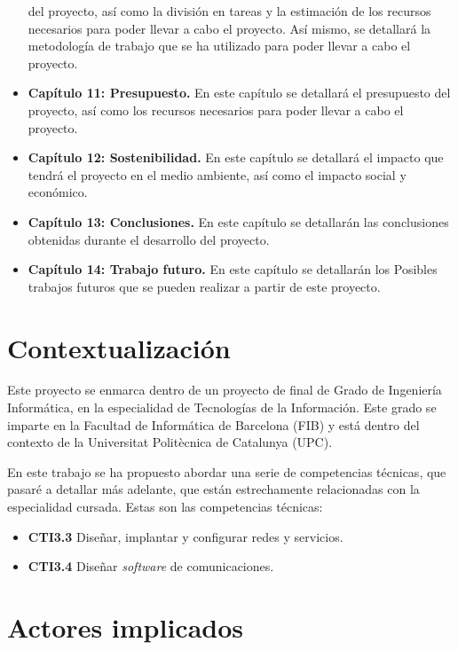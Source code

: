 \begin{itemize}
        del proyecto, así como la división en tareas y la estimación de los recursos
        necesarios para poder llevar a cabo el proyecto. Así mismo, se detallará la
        metodología de trabajo que se ha utilizado para poder llevar a cabo el proyecto.
    \item \textbf{Capítulo 11: Presupuesto.} En este capítulo se detallará el presupuesto
        del proyecto, así como los recursos necesarios para poder llevar a cabo el proyecto.
    \item \textbf{Capítulo 12: Sostenibilidad.} En este capítulo se detallará el impacto
        que tendrá el proyecto en el medio ambiente, así como el impacto social y económico.
    \item \textbf{Capítulo 13: Conclusiones.} En este capítulo se detallarán las conclusiones
        obtenidas durante el desarrollo del proyecto.
    \item \textbf{Capítulo 14: Trabajo futuro.} En este capítulo se detallarán los Posibles
        trabajos futuros que se pueden realizar a partir de este proyecto.
\end{itemize}

\section{Contextualización}
\label{sec:contextualizacion}


Este proyecto se enmarca dentro de un proyecto de final de Grado de Ingeniería
Informática, en la especialidad de Tecnologías de la Información. Este grado se
imparte en la Facultad de Informática de Barcelona (FIB) y está dentro del contexto
de la Universitat Politècnica de Catalunya (UPC).

En este trabajo se ha propuesto abordar una serie de competencias técnicas, que
pasaré a detallar más adelante, que están estrechamente relacionadas con la
especialidad cursada. Estas son las competencias técnicas:

\begin{itemize}
    \item \textbf{CTI3.3} Diseñar, implantar y configurar redes y servicios.
    \item \textbf{CTI3.4} Diseñar \textit{software} de comunicaciones.
\end{itemize}

\section{Actores implicados}
\label{sec:actores}

